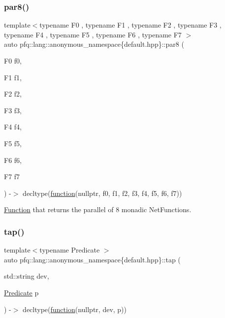 \subsubsection{\texorpdfstring{par8()}{par8()}}
{\footnotesize\ttfamily template$<$typename F0 , typename F1 , typename F2 , typename F3 , typename F4 , typename F5 , typename F6 , typename F7 $>$ \\
auto pfq\+::lang\+::anonymous\+\_\+namespace\{default.\+hpp\}\+::par8 (\begin{DoxyParamCaption}\item[{F0}]{f0,  }\item[{F1}]{f1,  }\item[{F2}]{f2,  }\item[{F3}]{f3,  }\item[{F4}]{f4,  }\item[{F5}]{f5,  }\item[{F6}]{f6,  }\item[{F7}]{f7 }\end{DoxyParamCaption}) -\/$>$ decltype(\hyperlink{namespacepfq_1_1lang_a1a4638059d700ae08d0ca63886ff2bb3}{function}(nullptr, f0, f1, f2, f3, f4, f5, f6, f7))
        }



\hyperlink{structpfq_1_1lang_1_1Function}{Function} that returns the parallel of 8 monadic Net\+Functions. 

\mbox{\label{namespacepfq_1_1lang_1_1anonymous__namespace_02default_8hpp_03_aa8b81192a22fb62555e19afe4560e326}} 
\subsubsection{\texorpdfstring{tap()}{tap()}}
{\footnotesize\ttfamily template$<$typename Predicate $>$ \\
auto pfq\+::lang\+::anonymous\+\_\+namespace\{default.\+hpp\}\+::tap (\begin{DoxyParamCaption}\item[{std\+::string}]{dev,  }\item[{\hyperlink{structpfq_1_1lang_1_1Predicate}{Predicate}}]{p }\end{DoxyParamCaption}) -\/$>$ decltype(\hyperlink{namespacepfq_1_1lang_a1a4638059d700ae08d0ca63886ff2bb3}{function}(nullptr, dev, p))
        }



